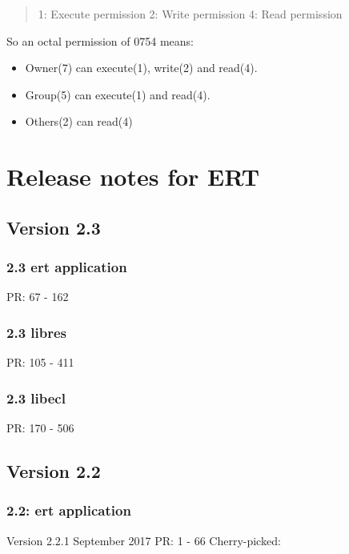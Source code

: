 \documentclass[letterpaper,10pt,english]{sphinxmanual}
\begin{document}
\begin{sphinxShadowBox}
\begin{quote}
1: Execute permission
2: Write permission
4: Read permission
\end{quote}

So an octal permission of 0754 means:
\begin{itemize}
\item {} 
Owner(7) can execute(1), write(2) and read(4).

\item {} 
Group(5) can execute(1) and read(4).

\item {} 
Others(2) can read(4)

\end{itemize}
\end{sphinxShadowBox}


\chapter{Release notes for ERT}
\label{\detokenize{changes/index:release-notes-for-ert}}\label{\detokenize{changes/index::doc}}

\section{Version 2.3}
\label{\detokenize{changes/index:version-2-3}}

\subsection{2.3 ert application}
\label{\detokenize{changes/index:ert-application}}
PR: 67 - 162


\subsection{2.3 libres}
\label{\detokenize{changes/index:libres}}
PR: 105 - 411


\subsection{2.3 libecl}
\label{\detokenize{changes/index:libecl}}
PR: 170 - 506


\section{Version 2.2}
\label{\detokenize{changes/index:version-2-2}}

\subsection{2.2: ert application}
\label{\detokenize{changes/index:id1}}
Version 2.2.1 September 2017 PR: 1 - 66
Cherry-picked: 
\end{document}
